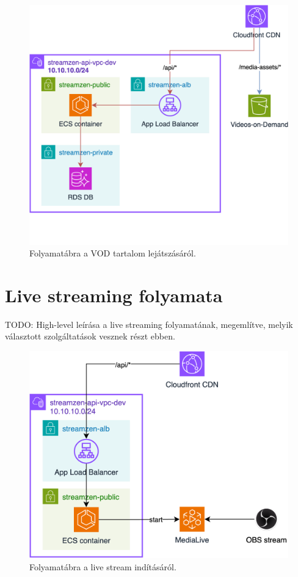 \begin{figure}[ht]
	\centering
	\includegraphics[width=120mm, keepaspectratio]{figures/dipterv_vod3.png}
	\caption{Folyamatábra a VOD tartalom lejátszásáról.}
	\label{fig:vod3}
\end{figure}

\section{Live streaming folyamata}

TODO: High-level leírása a live streaming folyamatának, megemlítve, melyik választott szolgáltatások vesznek részt ebben.

\begin{figure}[ht]
	\centering
	\includegraphics[width=120mm, keepaspectratio]{figures/dipterv_live1.png}
	\caption{Folyamatábra a live stream indításáról.}
	\label{fig:live1}
\end{figure}

